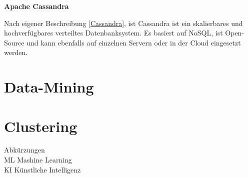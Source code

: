 \textbf{Apache Cassandra}\vspace{0.2cm}

Nach eigener Beschreibung [\href{https://cassandra.apache.org}{Cassandra}], ist Cassandra ist ein skalierbares und hochverfügbares verteiltes Datenbanksystem. Es basiert auf NoSQL, ist Open-Source und kann ebenfalls auf einzelnen Servern oder in der Cloud eingesetzt werden.

\section{Data-Mining}
\section{Clustering}


Abkürzungen\\
ML Mashine Learning\\
KI Künstliche Intelligenz